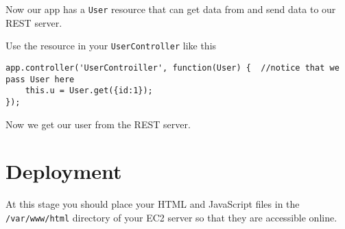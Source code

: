 \documentclass{article}
\begin{document}
Now our app has a \texttt{User} resource that can get data from and send data to our REST server.

Use the resource in your \texttt{UserController} like this

\begin{verbatim}
app.controller('UserControiller', function(User) {  //notice that we pass User here
	this.u = User.get({id:1});
});
\end{verbatim}

Now we get our user from the REST server.

\section{Deployment}
At this stage you should place your HTML and JavaScript files in the \texttt{/var/www/html} directory of
your EC2 server so that they are accessible online.
\end{document}
